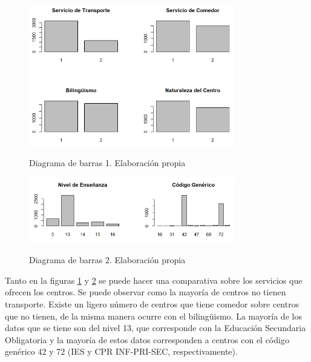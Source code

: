 \begin{subappendices}
\begin{figure}[htb]
	\centering
	\caption{Diagrama de barras 1. Elaboración propia}
	\includegraphics[width=0.8\textwidth]{recursos/ImagenesR/barplot1}
	\label{fig:barplot1}
\end{figure}
\FloatBarrier

\begin{figure}[htb]
	\centering
	\caption{Diagrama de barras 2. Elaboración propia}
	\includegraphics[width=0.8\textwidth]{recursos/ImagenesR/barplot2}
	\label{fig:barplot2}
\end{figure}
\FloatBarrier

Tanto en la figuras \ref{fig:barplot1} y \ref{fig:barplot2} se puede hacer una comparativa sobre los servicios que ofrecen los centros. Se puede observar como la mayoría de centros no tienen transporte. Existe un ligero número de centros que tiene comedor sobre centros que no tienen, de la misma manera ocurre con el bilingüismo. La mayoría de los datos que se tiene son del nivel 13, que corresponde con la Educación Secundaria Obligatoria y la mayoría de estos datos corresponden a centros con el código genérico 42 y 72 (IES y CPR INF-PRI-SEC, respectivamente).


\end{subappendices}
